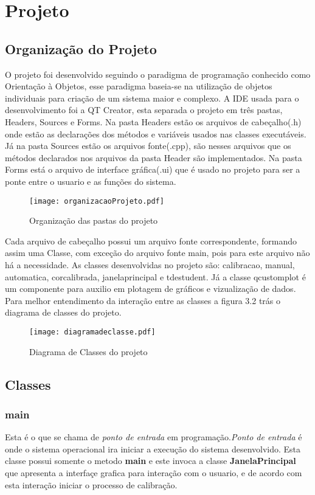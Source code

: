 	\section{Projeto}
	\subsection{Organização do Projeto}
	 O projeto foi desenvolvido seguindo o paradigma de programação conhecido como  Orientação à Objetos, esse paradigma baseia-se na utilização de objetos individuais para criação de um sistema maior e complexo. A IDE usada para o desenvolvimento foi a QT Creator, esta separada o projeto em três pastas, Headers, Sources e Forms. Na pasta Headers estão os arquivos de cabeçalho(.h) onde estão as declarações dos métodos e variáveis usados nas classes  executáveis. Já na pasta Sources estão os arquivos fonte(.cpp), são nesses arquivos que os métodos declarados nos arquivos da pasta Header são implementados. Na pasta Forms está o arquivo de interface gráfica(.ui) que é usado no projeto para ser a ponte entre o usuario e as funções do sistema.
	 
	\begin{figure}[!h]
		\centering
		\texttt{[image: organizacaoProjeto.pdf]}
		\caption{Organização das pastas do projeto}
		\label{Organizacao do Projeto}
	\end{figure}
	Cada arquivo de cabeçalho possui um arquivo fonte correspondente, formando assim uma Classe, com exceção do arquivo fonte main, pois para este arquivo não há a necessidade.
	As classes desenvolvidas no projeto são:
 calibracao, manual, automatica, corcalibrada, janelaprincipal e tdestudent. Já a classe qcustomplot é um componente para auxilio em plotagem de gráficos e vizualização de dados\cite{QCustomPlot}.
Para melhor entendimento da interação entre as classes a figura 3.2 trás o diagrama de classes do projeto.
	 \begin{figure}[!h]
	 	\centering
	 	\texttt{[image: diagramadeclasse.pdf]}
	 	\caption{Diagrama de Classes do projeto}
	 	\label{DiagramaDeClasse}
	 \end{figure}\newpage


\subsection{Classes}
\subsubsection{main}
 Esta é o que se chama de \textit{ponto de entrada} em programação.\textit{Ponto de entrada} é onde o sistema operacional ira iniciar a execução do sistema desenvolvido. Esta classe possui somente o metodo \textbf{main} e este invoca a classe \textbf{JanelaPrincipal} que apresenta a interfaçe grafica para interação com o usuario, e de acordo com esta interação iniciar o processo de calibração.
 
